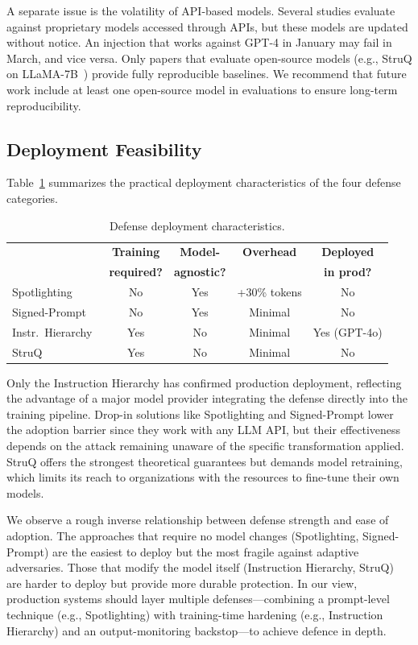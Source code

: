 A separate issue is the volatility of API-based models. Several studies evaluate against proprietary models accessed through APIs, but these models are updated without notice. An injection that works against GPT-4 in January may fail in March, and vice versa. Only papers that evaluate open-source models (e.g., StruQ on LLaMA-7B~\cite{chen2024struq}) provide fully reproducible baselines. We recommend that future work include at least one open-source model in evaluations to ensure long-term reproducibility.

\subsection{Deployment Feasibility}

Table~\ref{tab:deployment} summarizes the practical deployment characteristics of the four defense categories.

\begin{table}[t]
\centering
\caption{Defense deployment characteristics.}
\label{tab:deployment}
\footnotesize
\begin{tabular}{@{}lcccc@{}}
\toprule
 & \textbf{Training} & \textbf{Model-} & \textbf{Overhead} & \textbf{Deployed} \\
 & \textbf{required?} & \textbf{agnostic?} & & \textbf{in prod?} \\
\midrule
Spotlighting~\cite{hines2024spotlighting} & No & Yes & +30\% tokens & No \\
Signed-Prompt~\cite{suo2024signedprompt} & No & Yes & Minimal & No \\
Instr.\ Hierarchy~\cite{wallace2024hierarchy} & Yes & No & Minimal & Yes (GPT-4o) \\
StruQ~\cite{chen2024struq} & Yes & No & Minimal & No \\
\bottomrule
\end{tabular}
\end{table}

Only the Instruction Hierarchy has confirmed production deployment, reflecting the advantage of a major model provider integrating the defense directly into the training pipeline. Drop-in solutions like Spotlighting and Signed-Prompt lower the adoption barrier since they work with any LLM API, but their effectiveness depends on the attack remaining unaware of the specific transformation applied. StruQ offers the strongest theoretical guarantees but demands model retraining, which limits its reach to organizations with the resources to fine-tune their own models.

We observe a rough inverse relationship between defense strength and ease of adoption. The approaches that require no model changes (Spotlighting, Signed-Prompt) are the easiest to deploy but the most fragile against adaptive adversaries. Those that modify the model itself (Instruction Hierarchy, StruQ) are harder to deploy but provide more durable protection. In our view, production systems should layer multiple defenses---combining a prompt-level technique (e.g., Spotlighting) with training-time hardening (e.g., Instruction Hierarchy) and an output-monitoring backstop---to achieve defence in depth.
